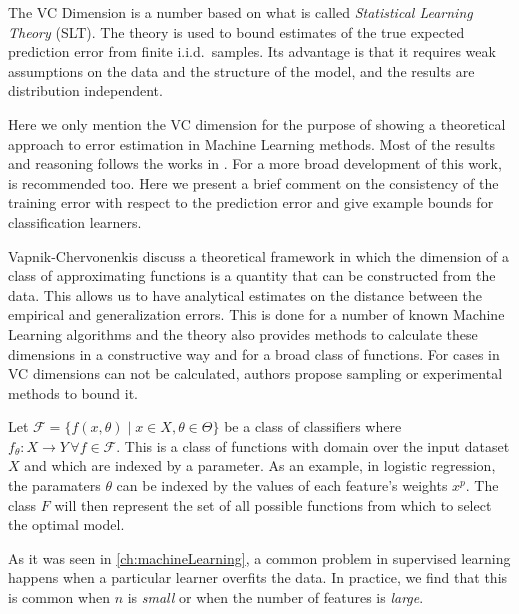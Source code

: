 The VC Dimension is a number based on what is called \textit{Statistical Learning Theory} (SLT).
The theory is used to bound estimates of the true expected prediction error from finite i.i.d.\ samples.
Its advantage is that it requires weak assumptions on the data and the structure of the model, and the results are distribution independent.

Here we only mention the VC dimension for the purpose of showing a theoretical approach to error estimation in Machine Learning methods.
Most of the results and reasoning follows the works in \citep{cherkassky-learning2007}.
For a more broad development of this work, \citep{vapnik-nature2000} is recommended too.
Here we present a brief comment on the consistency of the training error with respect to the prediction error and give example bounds for classification learners.


Vapnik-Chervonenkis discuss a theoretical framework in which the dimension of a class of approximating functions is a quantity that can be constructed from the data.
This allows us to have analytical estimates on the distance between the empirical and generalization errors.
This is done for a number of known Machine Learning algorithms and the theory also provides methods to calculate these dimensions in a constructive way and for a broad class of functions.
For cases in VC dimensions can not be calculated, authors propose sampling or experimental methods to bound it.


Let $\mathcal {F} = \big \{ f(x,\theta) \mid x \in X, \theta \in \Theta \big \}$ be a class of classifiers where $f_\theta: X \rightarrow Y \, \forall f \in \mathcal {F}$.
This is a class of functions with domain over the input dataset $X$ and which are indexed by a parameter.
As an example, in logistic regression, the paramaters $\theta$ can be indexed by the values of each feature's weights $x^p$.
The class $F$ will then represent the set of all possible functions from which to select the optimal model.

As it was seen in \cref{ch:machineLearning}, a common problem in supervised learning happens when a particular learner overfits the data.
In practice, we find that this is common when $n$ is \textit{small} or when the number of features is \textit{large}.

